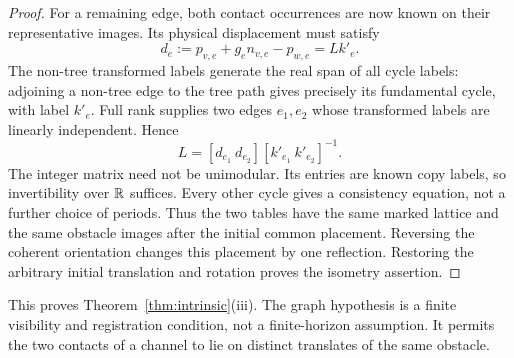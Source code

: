 \begin{proof}
For a remaining edge, both contact occurrences are now known on their
representative images. Its physical displacement must satisfy
\begin{equation}\label{eq:cyclelinear}
 d_e:=p_{v,e}+g_e n_{v,e}-p_{w,e}=L k'_e.
\end{equation}
The non-tree transformed labels generate the real span of all cycle
labels: adjoining a non-tree edge to the tree path gives precisely its
fundamental cycle, with label $k'_e$. Full rank supplies two edges
$e_1,e_2$ whose transformed labels are linearly independent. Hence
\begin{equation}\label{eq:latticerecover}
 L=[d_{e_1}\ d_{e_2}]
                 [k'_{e_1}\ k'_{e_2}]^{-1}.
\end{equation}
The integer matrix need not be unimodular. Its entries are known copy
labels, so invertibility over $\mathbb R$ suffices. Every other cycle gives
a consistency equation, not a further choice of periods. Thus the two
tables have the same marked lattice and the same obstacle images after
the initial common placement. Reversing the coherent orientation changes
this placement by one reflection. Restoring the arbitrary initial
translation and rotation proves the isometry assertion.
\end{proof}

This proves Theorem~\ref{thm:intrinsic}(iii). The graph hypothesis is a
finite visibility and registration condition, not a finite-horizon
assumption. It permits the two contacts of a channel to lie on distinct
translates of the same obstacle.

